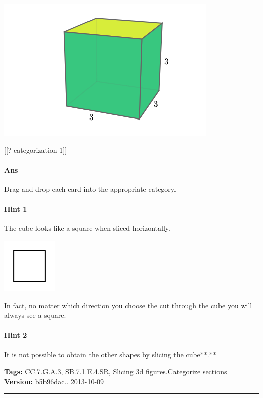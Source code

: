 \documentclass[twocolumn,10pt]{article}
\def\shrinkfactor{0.4}
\begin{document}
\includegraphics[scale=\shrinkfactor]{figures/3f4348c08edc4429693936406a5d387a49f9f22e.png}

[[? categorization 1]]

\paragraph{Ans} Drag and drop each card into the appropriate category. 

\paragraph{Hint 1}The cube looks like a square when sliced horizontally.  

\includegraphics[scale=\shrinkfactor]{figures/4b59a0ece6acc7c19c389e1de534d1df93bf1169.png}

In fact, no matter which direction you choose the cut through the cube you will always see a square.

\paragraph{Hint 2}It is not possible to obtain the other shapes by slicing the cube**.**



\medskip
\noindent
\textbf{Tags:} {\footnotesize CC.7.G.A.3, SB.7.1.E.4.SR, Slicing 3d figures.Categorize sections}\\
\textbf{Version:} b5b96dac.. 2013-10-09
\smallskip\hrule
\end{document}
